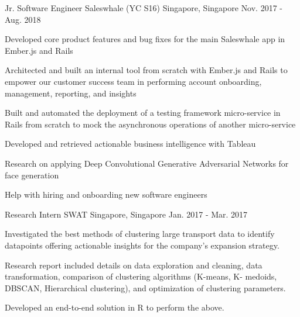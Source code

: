 

\begin{cventries}

  \cventry
    {Jr. Software Engineer} %
    {Saleswhale (YC S16)} %
    {Singapore, Singapore} %
    {Nov. 2017 - Aug. 2018} %
    {
      \begin{cvitems} %
      \item { Developed core product features and bug fixes for the main Saleswhale app in Ember.js and Rails}
      \item { Architected and built an internal tool from scratch with Ember.js and Rails to empower our customer success team in performing account onboarding, management, reporting, and insights}
      \item { Built and automated the deployment of a testing framework micro-service in Rails from scratch to mock the asynchronous operations of another micro-service}
      \item { Developed and retrieved actionable business intelligence with Tableau}
      \item { Research on applying Deep Convolutional Generative Adversarial Networks for face generation}
      \item { Help with hiring and onboarding new software engineers}
      \end{cvitems}
    }

  \cventry
    {Research Intern} %
    {SWAT} %
    {Singapore, Singapore} %
    {Jan. 2017 - Mar. 2017} %
    {
      \begin{cvitems} %
      \item { Investigated the best methods of clustering large transport data to identify datapoints offering actionable insights for the company’s expansion strategy.}
      \item { Research report included details on data exploration and cleaning, data transformation, comparison of clustering algorithms (K-means, K- medoids, DBSCAN, Hierarchical clustering), and optimization of clustering parameters.}
      \item { Developed an end-to-end solution in R to perform the above.}
      \end{cvitems}
    }


\end{cventries}
